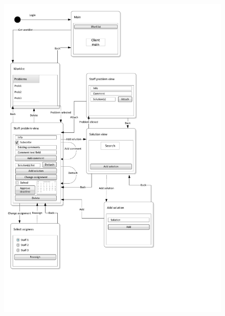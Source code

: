 \begin{figure}[H]
	\centering
		\includegraphics[width = \textwidth, clip=true, trim=0 4cm 5cm 0]{input/application_domain_analysis/Navigation_DiagramStaff.pdf}
	\morscaption{\sinterface[c]}
	\label{fig:Navigation_DiagramAdmin}
\end{figure}



